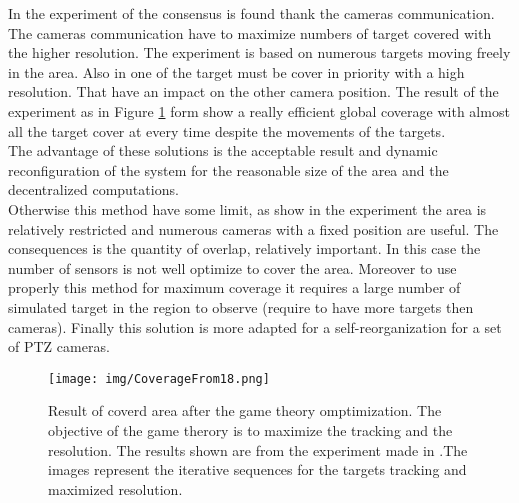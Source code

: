   In the experiment of \cite{18*ding2012,25*song2008} the consensus is found thank the cameras communication. The cameras communication have to maximize numbers of  target covered with the higher resolution.
 The experiment is based on numerous targets moving freely in the area. Also in \cite{18*ding2012} one of the target must be cover in priority with a high resolution. That have an impact on the other camera position.
 The result of the experiment as in Figure \ref{fig:CoverageFrom18} form \cite{18*ding2012} show a really efficient global coverage with almost all the target cover at every time despite the movements of the targets. \\
 The advantage of these solutions is the acceptable result and dynamic reconfiguration of the system for the reasonable size of the area and the decentralized computations.\\ 
Otherwise this method have some limit, as show in the experiment the area is relatively restricted and numerous cameras with a fixed position are useful. The consequences is the quantity of overlap, relatively important. In this case the number of sensors is not well optimize to cover the area. Moreover to use properly this method for maximum coverage it requires a large number of simulated target in the region to observe (require to have more targets then cameras).  Finally this solution is more adapted for a self-reorganization for a set of PTZ cameras.

\begin{figure}[t!]
\center
{}
   \texttt{[image: img/CoverageFrom18.png]}
  \caption{Result of coverd area after the game theory omptimization. The objective of the game therory is to maximize the tracking and the resolution. The results shown are from the experiment made in \cite{18*ding2012}.The images  represent the iterative sequences for the targets tracking and maximized resolution.}\label{fig:CoverageFrom18}\endminipage\hfill
\end{figure}
	
